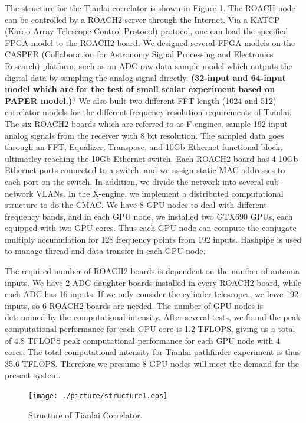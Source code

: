 \documentclass{ws-jai}
\begin{document}
	The structure for the Tianlai correlator is shown in Figure \ref{fig:structure}. The ROACH node can be controlled by a ROACH2-server through the Internet. Via a KATCP (Karoo Array Telescope Control Protocol) protocol, one can load the specified FPGA model to the ROACH2 board. We designed several FPGA models on the CASPER (Collaboration for Astronomy Signal Processing and Electronics Research) platform, such as an ADC raw data sample model which outputs the digital data by sampling the analog signal directly, \textbf{(32-input and 64-input model which are for the test of small scalar experiment based on PAPER model.)}?  We also built two different FFT length (1024 and 512) correlator models for the different frequency resolution requirements of Tianlai. The six ROACH2 boards which are referred to as F-engines, sample 192-input analog signals from the receiver with 8 bit resolution. The sampled data goes through an FFT, Equalizer, Transpose, and 10Gb Ethernet functional block, ultimatley reaching the 10Gb Ethernet switch. Each ROACH2 board has 4 10Gb Ethernet ports connected to a switch, and we assign static MAC addresses to each port on the switch. In addition, we divide the network into several sub-network VLANs. In the X-engine, we implement a distributed computational structure to do the CMAC. We have 8 GPU nodes to deal with different frequency bands, and in each GPU node, we installed two GTX690 GPUs, each equipped with two GPU cores. Thus each GPU node can compute the conjugate multiply accumulation for 128 frequency points from 192 inputs. Hashpipe is used to manage thread and data transfer in each GPU node. 
		
	The required number of ROACH2 boards is dependent on the number of antenna inputs. We have 2 ADC daughter boards installed in every ROACH2 board, while each ADC has 16 inputs. If we only consider the cylinder telescopes, we have 192 inputs, so 6 ROACH2 boards are needed. The number of GPU nodes is determined by the computational intensity. After several tests, we found the peak computational performance for each GPU core is 1.2 TFLOPS, giving us a total of 4.8 TFLOPS peak computational performance for each GPU node with 4 cores. The total computational intensity for Tianlai pathfinder experiment is thus 35.6 TFLOPS. Therefore we presume 8 GPU nodes will meet the demand for the present system.
\begin{figure}[t]
 \centering
 \texttt{[image: ./picture/structure1.eps]}
\caption{Structure of Tianlai Correlator.\label{fig:structure}}
\end{figure}
\\
\end{document}

